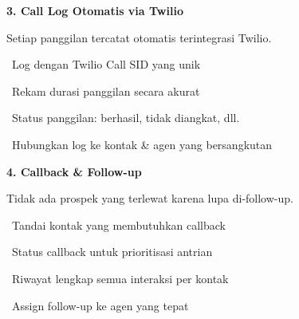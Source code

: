 \documentclass[a4paper]{article}
\begin{document}
\vspace{8pt}

\noindent
\begin{minipage}[t]{0.485\textwidth}
    \colorbox{EmeraldPrimary}{%
        \begin{minipage}{\dimexpr\textwidth-14pt}
            \vspace{5pt}
            {\fontsize{10}{13}\selectfont\bfseries\color{White} 3. Call Log Otomatis via Twilio}
            \vspace{5pt}
        \end{minipage}}
    \vspace{5pt}
    {\fontsize{9}{12}\selectfont\color{TextDark}%
    Setiap panggilan tercatat otomatis terintegrasi Twilio.\par\vspace{3pt}
    \textbullet\ Log dengan Twilio Call SID yang unik\par\vspace{2pt}%
    \textbullet\ Rekam durasi panggilan secara akurat\par\vspace{2pt}%
    \textbullet\ Status panggilan: berhasil, tidak diangkat, dll.\par\vspace{2pt}%
    \textbullet\ Hubungkan log ke kontak \& agen yang bersangkutan}%
\end{minipage}%
\hfill
\begin{minipage}[t]{0.485\textwidth}
    \colorbox{PurplePrimary}{%
        \begin{minipage}{\dimexpr\textwidth-14pt}
            \vspace{5pt}
            {\fontsize{10}{13}\selectfont\bfseries\color{White} 4. Callback \& Follow-up}
            \vspace{5pt}
        \end{minipage}}
    \vspace{5pt}
    {\fontsize{9}{12}\selectfont\color{TextDark}%
    Tidak ada prospek yang terlewat karena lupa di-follow-up.\par\vspace{3pt}
    \textbullet\ Tandai kontak yang membutuhkan callback\par\vspace{2pt}%
    \textbullet\ Status callback untuk prioritisasi antrian\par\vspace{2pt}%
    \textbullet\ Riwayat lengkap semua interaksi per kontak\par\vspace{2pt}%
    \textbullet\ Assign follow-up ke agen yang tepat}%
\end{minipage}
\end{document}
